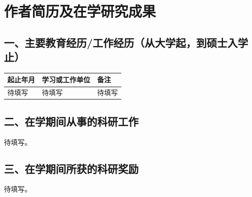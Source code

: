\chapter*{作者简历及在学研究成果}

\section*{一、主要教育经历/工作经历（从大学起，到硕士入学止）}

\noindent\begin{tabularx}{\textwidth}{|>{\centering\arraybackslash}X|>{\centering\arraybackslash}X|>{\centering\arraybackslash}X|}
  \hline
  起止年月 & 学习或工作单位 & 备注 \\\hline
  待填写 & 待填写 & 待填写 \\\hline
\end{tabularx}

\section*{二、在学期间从事的科研工作}
待填写。

\section*{三、在学期间所获的科研奖励}
待填写。
